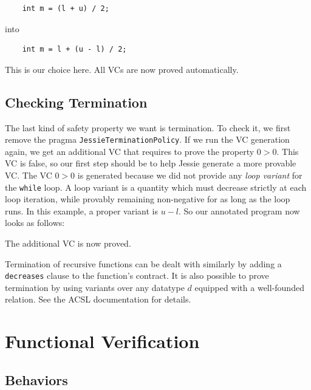 \documentclass[a4paper,11pt,twoside,openright]{report}
\begin{document}
\begin{verbatim}
    int m = (l + u) / 2;
\end{verbatim}

into

\begin{verbatim}
    int m = l + (u - l) / 2;
\end{verbatim}

This is our choice here. All VCs
are now proved automatically.

\section{Checking Termination}

The last kind of safety property we want is termination. To check it,
we first remove the pragma \texttt{JessieTerminationPolicy}. If we run
the VC generation again, we get an additional VC that requires to prove
the property $0 > 0$. This VC is false, so our first step should be
to help Jessie generate a more provable VC.
The VC $0 > 0$ is generated because we did not provide any
\emph{loop variant} for the \texttt{while} loop. A loop variant is a
quantity which must decrease strictly at each loop iteration, while
provably remaining non-negative for as long as the loop runs. 
In this example, a proper variant is $u-l$. 
So our annotated program now looks as follows:



The additional VC is now proved.

Termination of recursive functions can be dealt with similarly by
adding a \texttt{decreases} clause to the function's contract. 
It is also possible to prove termination by using variants over 
any datatype $d$ equipped with a well-founded relation. 
See the ACSL documentation for details.




\chapter{Functional Verification}


\section{Behaviors}
\end{document}
